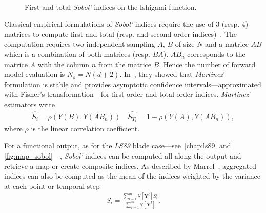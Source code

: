 \begin{figure}[H]               
\centering
{}
 ~       
\caption{First and total \textit{Sobol'} indices on the Ishigami function.}
\label{fig:sobol}
\end{figure}
Classical empirical formulations of \emph{Sobol'} indices require the use of 3 (resp. 4) matrices to compute first and total (resp. and second order indices)~\cite{Saltelli2010}. The computation requires two independent sampling $A$, $B$ of size $N$ and a matrice $AB$ which is a combination of both matrices (resp. $BA$). $AB_{n}$ corresponds to the matrice $A$ with the column $n$ from the matrice $B$. Hence the number of forward model evaluation is $N_s = N(d + 2)$. In~\citep{baudin2016}, they showed that \textit{Martinez}' formulation is stable and provides asymptotic confidence intervals---approximated with Fisher's transformation---for first order and total order indices. \textit{Martinez}' estimators write
\begin{align}
\hat{S_i} = \rho (Y(B), Y(AB_{n})) \quad \hat{S_{T_i}} = 1 - \rho (Y(A), Y(AB_n)),
\end{align}
\noindent where $\rho$ is the linear correlation coefficient.

For a functional output, as for the \textit{LS89} blade case---see~\cref{chap:ls89} and \cref{fig:map_sobol}---, \textit{Sobol'} indices can be computed all along the output and retrieve a map or create composite indices. As described by Marrel~\cite{marrel2015}, aggregated indices can also be computed as the mean of the indices weighted by the variance at each point or temporal step
\begin{align}
S_i = \frac{\displaystyle\sum_{l = 1}^{m} \mathbb{V} [\mathbf{Y}^l] S_i^{l}}{\displaystyle\sum_{l = 1}^{m} \mathbb{V} [\mathbf{Y}^l]}.
\end{align}

